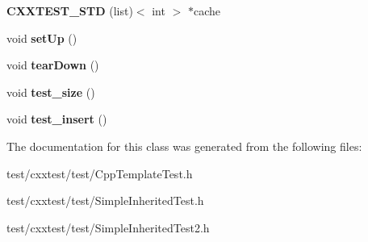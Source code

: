 \begin{DoxyCompactItemize}
\item 
\hypertarget{classTests_a76bb66df81ed2107ed8b37ead786a0ff}{{\bfseries C\-X\-X\-T\-E\-S\-T\-\_\-\-S\-T\-D} (list)$<$ int $>$ $\ast$cache}\label{classTests_a76bb66df81ed2107ed8b37ead786a0ff}

\item 
\hypertarget{classTests_a6aff512703af4402af75821955332f56}{void {\bfseries set\-Up} ()}\label{classTests_a6aff512703af4402af75821955332f56}

\item 
\hypertarget{classTests_a3c1e5b676a31d3545693f01d1da4174a}{void {\bfseries tear\-Down} ()}\label{classTests_a3c1e5b676a31d3545693f01d1da4174a}

\item 
\hypertarget{classTests_a9b6e00b5941829080a4a8bcc0021db12}{void {\bfseries test\-\_\-size} ()}\label{classTests_a9b6e00b5941829080a4a8bcc0021db12}

\item 
\hypertarget{classTests_a492b61d666bd761cddcf532bbd4549ed}{void {\bfseries test\-\_\-insert} ()}\label{classTests_a492b61d666bd761cddcf532bbd4549ed}

\end{DoxyCompactItemize}


The documentation for this class was generated from the following files\-:\begin{DoxyCompactItemize}
\item 
test/cxxtest/test/Cpp\-Template\-Test.\-h\item 
test/cxxtest/test/Simple\-Inherited\-Test.\-h\item 
test/cxxtest/test/Simple\-Inherited\-Test2.\-h\end{DoxyCompactItemize}
